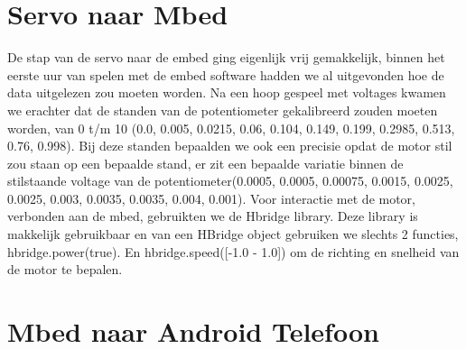 \documentclass[pdftex,12pt,a4paper]{article}
\begin{document}

\section{Servo naar Mbed}
De stap van de servo naar de embed ging eigenlijk vrij gemakkelijk, binnen het eerste uur van spelen met de embed software hadden we al uitgevonden hoe de data uitgelezen zou moeten worden. Na een hoop gespeel met voltages kwamen we erachter dat de standen van de potentiometer gekalibreerd zouden moeten worden, van 0 t/m 10 (0.0, 0.005, 0.0215, 0.06, 0.104, 0.149, 0.199, 0.2985, 0.513, 0.76, 0.998).
Bij deze standen bepaalden we ook een precisie opdat de motor stil zou staan op een bepaalde stand, er zit een bepaalde variatie binnen de stilstaande voltage van de potentiometer(0.0005, 0.0005, 0.00075, 0.0015, 0.0025, 0.0025, 0.003, 0.0035, 0.0035, 0.004, 0.001).
Voor interactie met de motor, verbonden aan de mbed, gebruikten we de Hbridge library. Deze library is makkelijk gebruikbaar en van een HBridge object gebruiken we slechts 2 functies, hbridge.power(true). En hbridge.speed([-1.0 - 1.0]) om de richting en snelheid van de motor te bepalen.


\section{Mbed naar Android Telefoon}
\end{document}
